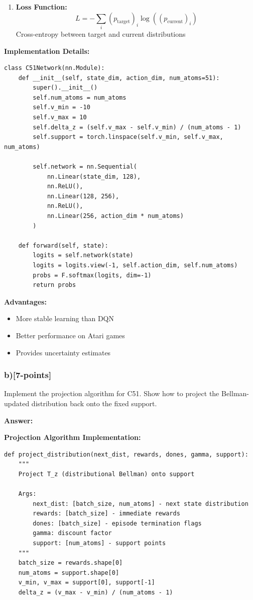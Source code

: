 \documentclass[12pt]{article}
\begin{document}
{{\begin{enumerate}
\item \textbf{Loss Function:}
\begin{equation}
L = -\sum_i (p_{\text{target}})_i \log((p_{\text{current}})_i)
\end{equation}
Cross-entropy between target and current distributions
\end{enumerate}

\textbf{Implementation Details:}
\begin{verbatim}
class C51Network(nn.Module):
    def __init__(self, state_dim, action_dim, num_atoms=51):
        super().__init__()
        self.num_atoms = num_atoms
        self.v_min = -10
        self.v_max = 10
        self.delta_z = (self.v_max - self.v_min) / (num_atoms - 1)
        self.support = torch.linspace(self.v_min, self.v_max, num_atoms)

        self.network = nn.Sequential(
            nn.Linear(state_dim, 128),
            nn.ReLU(),
            nn.Linear(128, 256),
            nn.ReLU(),
            nn.Linear(256, action_dim * num_atoms)
        )

    def forward(self, state):
        logits = self.network(state)
        logits = logits.view(-1, self.action_dim, self.num_atoms)
        probs = F.softmax(logits, dim=-1)
        return probs
\end{verbatim}

\textbf{Advantages:}
\begin{itemize}
\item More stable learning than DQN
\item Better performance on Atari games
\item Provides uncertainty estimates
\end{itemize}

\subsubsection{b)[7-points]} Implement the projection algorithm for C51. Show how to project the Bellman-updated distribution back onto the fixed support.

\textbf{Answer:}

\textbf{Projection Algorithm Implementation:}

\begin{verbatim}
def project_distribution(next_dist, rewards, dones, gamma, support):
    """
    Project T_z (distributional Bellman) onto support
    
    Args:
        next_dist: [batch_size, num_atoms] - next state distribution
        rewards: [batch_size] - immediate rewards
        dones: [batch_size] - episode termination flags
        gamma: discount factor
        support: [num_atoms] - support points
    """
    batch_size = rewards.shape[0]
    num_atoms = support.shape[0]
    v_min, v_max = support[0], support[-1]
    delta_z = (v_max - v_min) / (num_atoms - 1)
    

\end{verbatim}}}
\end{document}
